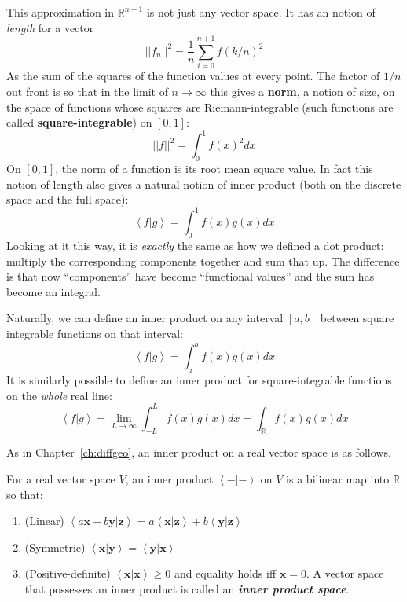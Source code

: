 \documentclass[../master.tex]{subfiles}
\begin{document}
	This approximation in $\mathbb R^{n+1}$ is not just any vector space. It has an notion of \emph{length} for a vector
	\begin{equation}
		||f_n||^2 = \frac{1}{n} \sum_{i=0}^{n+1} f(k/n)^2 
	\end{equation}
	As the sum of the squares of the function values at every point. The factor of $1/n$ out front is so that in the limit of $n\rightarrow \infty$ this gives a \textbf{norm}, a notion of size, on the space of functions whose squares are Riemann-integrable (such functions are called \textbf{square-integrable}) on $[0,1]$: 
	\begin{equation}
		||f||^2 = \int_{0}^1 f(x)^2 dx
	\end{equation}
	On $[0,1]$, the norm of a function is its root mean square value. In fact this notion of length also gives a natural notion of inner product (both on the discrete space and the full space):
	\begin{equation}
		\left< f | g \right> = \int_{0}^1 f(x) g(x) dx
	\end{equation}
	Looking at it this way, it is \emph{exactly} the same as how we defined a dot product: multiply the corresponding components together and sum that up. The difference is that now ``components'' have become ``functional values'' and the sum has become an integral.
	
	Naturally, we can define an inner product on any interval $[a,b]$ between square integrable functions on that interval:
	\begin{equation}
		\left< f | g\right> = \int_a^b f(x)g(x) dx
	\end{equation}
	 It is similarly possible to define an inner product for square-integrable functions on the \emph{whole} real line:
	\begin{equation}
		\left< f | g \right> = \lim_{L \rightarrow \infty} \int_{-L}^L f(x) g(x) dx = \int_{\mathbb R} f(x) g(x) dx
	\end{equation}
	
	As in Chapter~\ref{ch:diffgeo}, an inner product on a real vector space is as follows. 
	\begin{defn}
		For a real vector space $V$, an inner product $\left<-|-\right>$ on $V$ is a bilinear map into $\mathbb R$ so that:
		\begin{enumerate}
			\item (Linear) $\left<a \mathbf x + b \mathbf y | \mathbf z\right> = a \left< \mathbf x | \mathbf z \right> + b \left< \mathbf y | \mathbf z \right>$
			\item (Symmetric) $\left<\mathbf x | \mathbf y\right> = \left< \mathbf y | \mathbf x\right>$
			\item (Positive-definite) $\left< \mathbf x | \mathbf x \right> \geq 0$ and equality holds iff $\mathbf x = 0$. A vector space that possesses an inner product is called an \emph{\textbf{inner product space}}.
		\end{enumerate}
	\end{defn}
	
\end{document}
